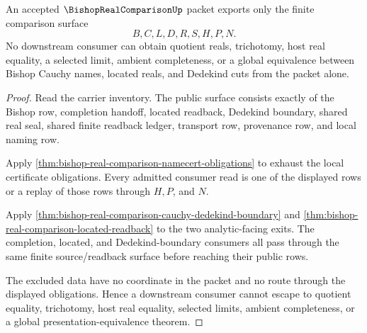 \begin{theorem}
\label{thm:bishop-real-comparison-nonescape}
An accepted $\BishopRealComparisonUp$ packet exports only the finite comparison surface
$$
B,C,L,D,R,S,H,P,N.
$$
No downstream consumer can obtain quotient reals, trichotomy, host real equality, a selected limit, ambient completeness, or a global equivalence between Bishop Cauchy names, located reals, and Dedekind cuts from the packet alone.
\end{theorem}
\begin{proof}
Read the carrier inventory. The public surface consists exactly of the Bishop row, completion handoff, located readback, Dedekind boundary, shared real seal, shared finite readback ledger, transport row, provenance row, and local naming row.

Apply \autoref{thm:bishop-real-comparison-namecert-obligations} to exhaust the local certificate obligations. Every admitted consumer read is one of the displayed rows or a replay of those rows through $H,P$, and $N$.

Apply \autoref{thm:bishop-real-comparison-cauchy-dedekind-boundary} and \autoref{thm:bishop-real-comparison-located-readback} to the two analytic-facing exits. The completion, located, and Dedekind-boundary consumers all pass through the same finite source/readback surface before reaching their public rows.

The excluded data have no coordinate in the packet and no route through the displayed obligations. Hence a downstream consumer cannot escape to quotient equality, trichotomy, host real equality, selected limits, ambient completeness, or a global presentation-equivalence theorem.
\end{proof}

